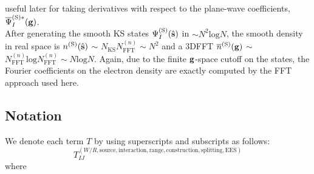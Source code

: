 \documentclass[paper=a4, fontsize=11pt]{article} %
\numberwithin{equation}{section} %
\numberwithin{figure}{section} %
\numberwithin{table}{section} %
\newcommand{\bs}{{\bf{s}}}
\newcommand{\bg}{{\bf{g}}}
\newcommand{\rS}{{\mathrm{S}}}
\newcommand{\rEES}{{\mathrm{EES}}}
\newcommand{\rl}{{\mathrm{log}}}
\newcommand{\psigsc}{{\overline \Psi_I^{(\rS)*}(\bg)}}
\newcommand{\NKS}{{N_{\mathrm{KS}}}}
\newcommand{\NFFTn}{{N^{(n)}_{\mathrm{FFT}}}}
\begin{document}
useful later for taking derivatives with respect to the plane-wave coefficients,  $\psigsc$.\\

After generating the smooth KS states $\Psi_I^{(\rS)}(\hat \bs)$ in $\sim N^2 \rl N$, the smooth density in real space is $n^{(\rS)}(\hat \bs)$ $\sim$ $\NKS \NFFTn \sim N^2$ and a 3DFFT $\overline{n}^{(\rS)}(\bg)$ $\sim$ $\NFFTn \rl \NFFTn \sim N \rl N$. Again, due to the finite $\bg$-space cutoff on the states, the Fourier coefficients on the electron density are exactly computed by the FFT approach used here.

\subsection{Notation}
We denote each term $T$ by using superscripts and subscripts as follows:
\begin{equation}
T^{(W/R,\mathrm{source},\mathrm{interaction},\mathrm{range},\mathrm{construction},\mathrm{splitting},\rEES)}_{IJ}
\end{equation}
where
\end{document}
